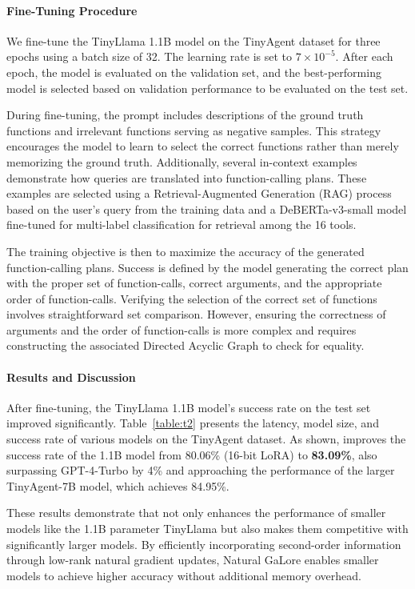 \paragraph{Fine-Tuning Procedure}

We fine-tune the TinyLlama 1.1B model on the TinyAgent dataset for three epochs using a batch size of 32. The learning rate is set to \(7 \times 10^{-5}\). After each epoch, the model is evaluated on the validation set, and the best-performing model is selected based on validation performance to be evaluated on the test set.

During fine-tuning, the prompt includes descriptions of the ground truth functions and irrelevant functions serving as negative samples. This strategy encourages the model to learn to select the correct functions rather than merely memorizing the ground truth. Additionally, several in-context examples demonstrate how queries are translated into function-calling plans. These examples are selected using a Retrieval-Augmented Generation (RAG) process based on the user's query from the training data and a DeBERTa-v3-small model \citep{he2021debertav3} fine-tuned for multi-label classification for retrieval among the 16 tools.

The training objective is then to maximize the accuracy of the generated function-calling plans. Success is defined by the model generating the correct plan with the proper set of function-calls, correct arguments, and the appropriate order of function-calls. Verifying the selection of the correct set of functions involves straightforward set comparison. However, ensuring the correctness of arguments and the order of function-calls is more complex and requires constructing the associated Directed Acyclic Graph to check for equality.

\paragraph{Results and Discussion}



After fine-tuning, the TinyLlama 1.1B model's success rate on the test set improved significantly. Table~\ref{table:t2} presents the latency, model size, and success rate of various models on the TinyAgent dataset. As shown, \textit{\lowrank} improves the success rate of the 1.1B model from 80.06\% (16-bit LoRA) to \textbf{83.09\%}, also surpassing GPT-4-Turbo by 4\% and approaching the performance of the larger TinyAgent-7B model, which achieves 84.95\%.

These results demonstrate that \textit{\lowrank} not only enhances the performance of smaller models like the 1.1B parameter TinyLlama but also makes them competitive with significantly larger models. By efficiently incorporating second-order information through low-rank natural gradient updates, Natural GaLore enables smaller models to achieve higher accuracy without additional memory overhead.